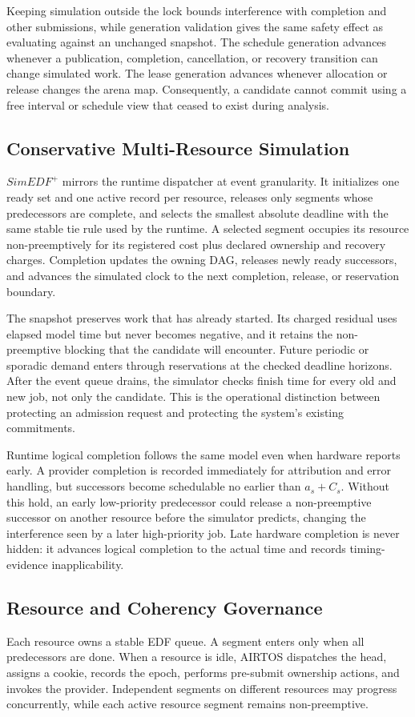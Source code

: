 \documentclass[lettersize,journal]{IEEEtran}
\begin{document}
Keeping simulation outside the lock bounds interference with completion and
other submissions, while generation validation gives the same safety effect
as evaluating against an unchanged snapshot. The schedule generation advances
whenever a publication, completion, cancellation, or recovery transition can
change simulated work. The lease generation advances whenever allocation or
release changes the arena map. Consequently, a candidate cannot commit using a
free interval or schedule view that ceased to exist during analysis.

\subsection{Conservative Multi-Resource Simulation}
$SimEDF^+$ mirrors the runtime dispatcher at event granularity. It initializes
one ready set and one active record per resource, releases only segments whose
predecessors are complete, and selects the smallest absolute deadline with the
same stable tie rule used by the runtime. A selected segment occupies its
resource non-preemptively for its registered cost plus declared ownership and
recovery charges. Completion updates the owning DAG, releases newly ready
successors, and advances the simulated clock to the next completion, release,
or reservation boundary.

The snapshot preserves work that has already started. Its charged residual
uses elapsed model time but never becomes negative, and it retains the
non-preemptive blocking that the candidate will encounter. Future periodic or
sporadic demand enters through reservations at the checked deadline horizons.
After the event queue drains, the simulator checks finish time for every old
and new job, not only the candidate. This is the operational distinction
between protecting an admission request and protecting the system's existing
commitments.

Runtime logical completion follows the same model even when hardware reports
early. A provider completion is recorded immediately for attribution and error
handling, but successors become schedulable no earlier than $a_s+C_s$.
Without this hold, an early low-priority predecessor could release a
non-preemptive successor on another resource before the simulator predicts,
changing the interference seen by a later high-priority job. Late hardware
completion is never hidden: it advances logical completion to the actual time
and records timing-evidence inapplicability.

\subsection{Resource and Coherency Governance}
Each resource owns a stable EDF queue. A segment enters only when all
predecessors are done. When a resource is idle, AIRTOS dispatches the head,
assigns a cookie, records the epoch, performs pre-submit ownership actions, and
invokes the provider. Independent segments on different resources may progress
concurrently, while each active resource segment remains non-preemptive.
\end{document}
